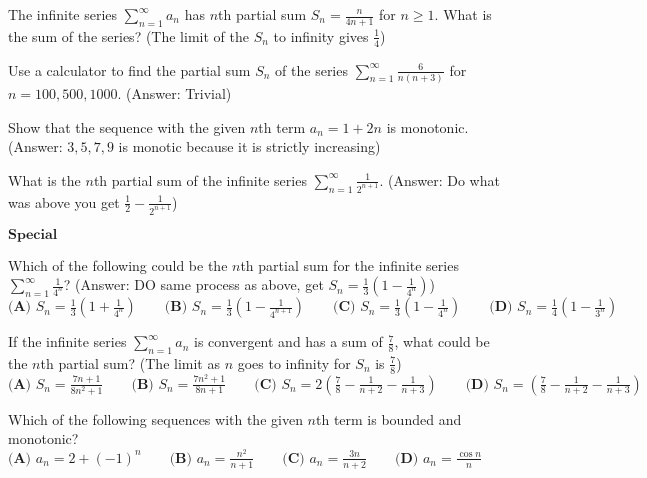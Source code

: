 \documentclass[../chem.tex]{subfiles}
\begin{document}
\ex The infinite series $\sum_{n=1}^{\infty}a_n$ has $n$th partial sum $S_n=\frac{n}{4n+1}$ for $n\geq 1$. What is the sum of the series? (The limit of the $S_n$ to infinity gives $\frac{1}{4}$)

\ex Use a calculator to find the partial sum $S_n$ of the series $\sum_{n=1}^{\infty}\frac{6}{n(n+3)}$ for $n=100,500,1000$. (Answer: Trivial)

\ex Show that the sequence with the given $n$th term $a_n=1+2n$ is monotonic. (Answer: $3,5,7,9$ is monotic because it is strictly increasing)

\ex What is the $n$th partial sum of the infinite series $\sum_{n=1}^{\infty} \frac{1}{2^{n+1}}$. (Answer: Do what was above you get $\frac{1}{2}-\frac{1}{2^{n+1}}$)

$\textbf{Special}$

\ex Which of the following could be the $n$th partial sum for the infinite series $\sum_{n=1}^{\infty}\frac{1}{4^n}$? (Answer: DO same process as above, get $S_n=\frac{1}{3}(1-\frac{1}{4^n})$)
$\textbf{(A) } S_n = \frac{1}{3}(1+\frac{1}{4^n}) \qquad \textbf{(B) } S_n=\frac{1}{3}(1-\frac{1}{4^{n+1}}) \qquad \textbf{(C) } S_n=\frac{1}{3}(1-\frac{1}{4^n}) \qquad \textbf{(D) } S_n=\frac{1}{4}(1-\frac{1}{3^n})$

\ex If the infinite series $\sum_{n=1}^{\infty}a_n$ is convergent and has a sum of $\frac{7}{8}$, what could be the $n$th partial sum? (The limit as $n$ goes to infinity for $S_n$ is $\frac{7}{8}$)
$\textbf{(A) } S_n = \frac{7n+1}{8n^2+1} \qquad \textbf{(B) } S_n = \frac{7n^2+1}{8n+1} \qquad \textbf{(C) } S_n = 2(\frac{7}{8}-\frac{1}{n+2}-\frac{1}{n+3}) \qquad \textbf{(D) } S_n = (\frac{7}{8}-\frac{1}{n+2}-\frac{1}{n+3})$

\ex Which of the following sequences with the given $n$th term is bounded and monotonic?
$\textbf{(A) } a_n=2+(-1)^n \qquad \textbf{(B) } a_n=\frac{n^2}{n+1} \qquad \textbf{(C) } a_n = \frac{3n}{n+2} \qquad \textbf{(D) } a_n = \frac{\cos n}{n}$
\end{document}
